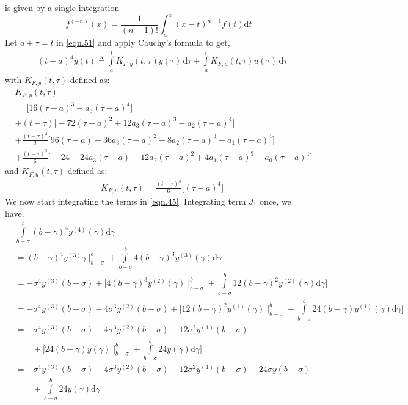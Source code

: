 \documentclass{article}
\begin{document}
is given by a single integration
\begin{equation}\label{eqn.53}
f^{(-n)}(x) = \frac{1}{(n-1)!}\int_{a}^{x} (x-t)^{n-1} f(t)\mathrm{d}t
\end{equation}
Let $a+\tau=t$ in \eqref{eqn.51} and apply Cauchy's formula to get,
\begin{equation}\label{eqn.54}
\begin{split}
	&(t-a)^{4}y(t)\triangleq\int\limits_{a}^{t} K_{F,y}(t,\tau) y(\tau)\, \mathrm{d}\tau + \int\limits_{a}^{t} K_{F,u}(t,\tau) u(\tau)\, \mathrm{d}\tau
\end{split}
\end{equation}
with $K_{F,y}(t,\tau)$ defined as: 
\begin{equation}\label{eqn.55}
\begin{split}
	& K_{F,y}(t,\tau)\\
	&=\bigg[16(\tau-a)^{3}-a_3(\tau-a)^{4}\bigg]\\
	&+(t-\tau)\bigg[-72(\tau-a)^2 + 12a_3(\tau-a)^3 - a_2(\tau-a)^4\bigg]\\
	&+\frac{(t-\tau)^2}{2}\bigg[96(\tau-a) - 36a_3(\tau-a)^2 + 8a_2(\tau-a)^3 -a_1(\tau-a)^4\bigg]\\
	&+\frac{(t-\tau)^3}{6}\bigg[-24 + 24a_3(\tau-a) - 12a_2(\tau-a)^2 + 4a_1(\tau-a)^3 - a_0(\tau-a)^4\bigg]	
\end{split}
\end{equation}
and $K_{F,u}(t,\tau)$ defined as:
\begin{equation}\label{eqn.56}
\begin{split}
	& K_{F,u}(t,\tau)=\frac{(t-\tau)^3}{6}\bigg[(\tau-a)^4\bigg]
\end{split}
\end{equation}
We now start integrating the terms in \eqref{eqn.45}. Integrating term $J_1$ once, we have,
\begin{equation}\label{eqn.57}
\begin{split}
	&\int\limits_{b-\sigma}^{b}(b-\gamma)^{4}y^{(4)}(\gamma)\mathrm{d}\gamma\\&= (b-\gamma)^4y^{(3)}\gamma\mid_{b-\sigma}^{b} + \int\limits_{b-\sigma}^{b}4(b-\gamma)^3y^{(3)}(\gamma)\mathrm{d}\gamma\\
	&= -\sigma^4y^{(3)}(b-\sigma) + \bigg[4(b-\gamma)^{3}y^{(2)}(\gamma)\mid_{b-\sigma}^{b} + \int\limits_{b-\sigma}^{b}12(b-\gamma)^2y^{(2)}(\gamma)\mathrm{d}\gamma\bigg]\\
	&= -\sigma^4y^{(3)}(b-\sigma) - 4\sigma^3y^{(2)}(b-\sigma) + \bigg[12(b-\gamma)^2y^{(1)}(\gamma)\mid_{b-\sigma}^{b} + \int\limits_{b-\sigma}^{b}24(b-\gamma)y^{(1)}(\gamma)\mathrm{d}\gamma\bigg]\\
	&= -\sigma^4y^{(3)}(b-\sigma) - 4\sigma^3y^{(2)}(b-\sigma) - 12\sigma^2y^{(1)}(b-\sigma) 
	\\&\qquad{}+ \bigg[24(b-\gamma)y(\gamma)\mid_{b-\sigma}^{b} + \int\limits_{b-\sigma}^{b}24y(\gamma)\mathrm{d}\gamma\bigg]\\
	&= -\sigma^4y^{(3)}(b-\sigma) - 4\sigma^3y^{(2)}(b-\sigma) - 12\sigma^2y^{(1)}(b-\sigma) -24\sigma y(b-\sigma) 
	\\&\qquad{}+ \int\limits_{b-\sigma}^{b}24y(\gamma)\mathrm{d}\gamma
\end{split}
\end{equation}
\end{document}
